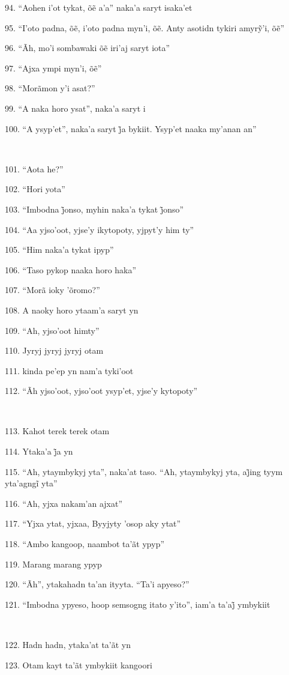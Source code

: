 94. ``Aohen i’ot tykat, õẽ a’a'' naka’a saryt isaka’et

95. ``I’oto padna, õẽ, i’oto padna myn’i, õẽ. Anty asotidn tykiri amyrỹ’i, õẽ''

96. ``Ãh, mo’i sombawaki õẽ iri’aj saryt iota''

97. ``Ajxa ympi myn’i, õẽ''

98. ``Morãmon y'i asat?''

99. ``A naka horo ysat'', naka'a saryt i

100. ``A ysyp’et'', naka’a saryt j̃a bykiit. Ysyp’et naaka my’anan an''

~

101. ``Aota he?''

102. ``Hori yota''

103. ``Imbodna j̃onso, myhin naka’a tykat j̃onso''

104. ``Aa yjso'oot, yjse'y ikytopoty, yjpyt'y him ty''

105. ``Him naka'a tykat ipyp''

106. ``Taso pykop naaka horo haka''

107. ``Morã ioky 'õromo?''

108. A naoky horo ytaam'a saryt yn

109. ``Ah, yjso'oot himty''

110. Jyryj jyryj jyryj otam

111. kinda pe'ep yn nam'a tyki'oot

112. ``Ãh yjso'oot, yjso'oot ysyp'et, yjse'y kytopoty''

~

113. Kahot terek terek otam

114. Ytaka’a j̃a yn

115. ``Ah, ytaymbykyj yta'', naka’at taso. ``Ah, ytaymbykyj yta, aj̃ing tyym yta’agngĩ yta''

116. ``Ah, yjxa nakam'an ajxat''

117. ``Yjxa ytat, yjxaa, Byyjyty 'osop aky ytat''

118. ``Ambo kangoop, naambot ta'ãt ypyp''

119. Marang marang ypyp

120. ``Ãh'', ytakahadn ta'an ityyta. ``Ta'i apyeso?''

121. ``Imbodna ypyeso, hoop semsogng itato y’ito'', iam’a ta’aj̃ ymbykiit

~

122. Hadn hadn, ytaka'at ta'ãt yn

123. Otam kayt ta'ãt ymbykiit kangoori

